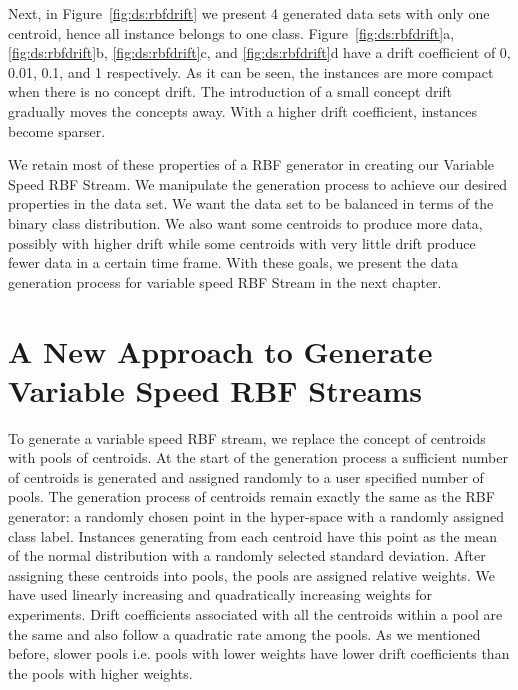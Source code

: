 Next, in Figure~\ref{fig:ds:rbfdrift} we present 4 generated data sets with only one centroid, hence all instance belongs to one class. Figure~\ref{fig:ds:rbfdrift}a, \ref{fig:ds:rbfdrift}b, \ref{fig:ds:rbfdrift}c, and \ref{fig:ds:rbfdrift}d have a drift coefficient of 0, 0.01, 0.1, and 1 respectively. As it can be seen, the instances are more compact when there is no concept drift. The introduction of a small concept drift gradually moves the concepts away. With a higher drift coefficient, instances become sparser.

We retain most of these properties of a RBF generator in creating our Variable Speed RBF Stream. We manipulate the generation process to achieve our desired properties in the data set. We want the data set to be balanced in terms of the binary class distribution. We also want some centroids to produce more data, possibly with higher drift while some centroids with very little drift produce fewer data in a certain time frame. With these goals, we present the data generation process for variable speed RBF Stream in the next chapter.

\section{A New Approach to Generate Variable Speed RBF Streams}
To generate a variable speed RBF stream, we replace the concept of centroids with pools of centroids. At the start of the generation process a sufficient number of centroids is generated and assigned randomly to a user specified number of pools. The generation process of centroids remain exactly the same as the RBF generator: a randomly chosen point in the hyper-space with a randomly assigned class label. Instances generating from each centroid have this point as the mean of the normal distribution with a randomly selected standard deviation. After assigning these centroids into pools, the pools are assigned relative weights. We have used linearly increasing and quadratically increasing weights for experiments. Drift coefficients associated with all the centroids within a pool are the same and also follow  a quadratic rate among the pools. As we mentioned before, slower pools i.e. pools with lower weights have lower drift coefficients than the pools with higher weights.


